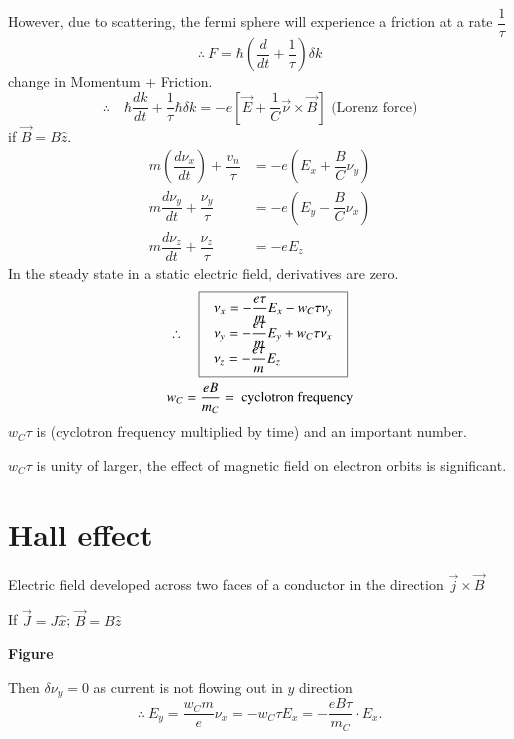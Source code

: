 However, due to scattering, the fermi sphere will experience a friction at a rate $\dfrac{1}{\tau}$
$$
\therefore \ F=\hbar \left(\dfrac{d}{dt}+\dfrac{1}{\tau}\right)\delta k
$$
change in Momentum + Friction.
$$
\therefore\quad \hbar \dfrac{dk}{dt}+\dfrac{1}{\tau}\hbar \delta k=-e\left[\overrightarrow{E}+\dfrac{1}{C}\overrightarrow{\nu}\times \overrightarrow{B}\right] \text{ (Lorenz force)}
$$
if $\overrightarrow{B}=B\widehat{z}$.
\begin{align*}
m\left(\dfrac{d\nu_{x}}{dt}\right)+\dfrac{v_{n}}{\tau} &= -e\left(E_{x}+\dfrac{B}{C}\nu_{y}\right)\\[3pt]
m\dfrac{d\nu_{y}}{dt}+\dfrac{\nu_{y}}{\tau} &= -e\left(E_{y}-\dfrac{B}{C}\nu_{x}\right)\\
m\dfrac{d\nu_{z}}{dt}+\dfrac{\nu_{z}}{\tau} &= -eE_{z}
\end{align*}
In the steady state in a static electric field, derivatives are zero.
\begin{gather*}
\therefore\quad 
\fbox{
$
\begin{array}{l}
\nu_{x}=-\dfrac{e\tau}{m}E_{x}-w_{C}\tau \nu_{y}\\
\nu_{y}=-\dfrac{e\tau}{m}E_{y}+w_{C}\tau \nu_{x}\\
\nu_{z}=-\dfrac{e\tau}{m}E_{z}
\end{array}
$
}\\
w_{C}=\dfrac{eB}{m_{C}}=\text{ cyclotron frequency}
\end{gather*}
$w_{C}\tau$ is (cyclotron frequency multiplied by time) and an important number.

$w_{C}\tau$ is unity of larger, the effect of magnetic field on electron orbits is significant.

\section*{Hall effect}

Electric field developed across two faces of a conductor in the direction $\overrightarrow{j}\times \overrightarrow{B}$

If $\overrightarrow{J}=J\widehat{x}$; $\overrightarrow{B}=B\widehat{z}$
\begin{center}
{\bf Figure}
\end{center}

Then $\delta \nu_{y}=0$ as current is not flowing out in $y$ direction
$$
\therefore \ E_{y}=\dfrac{w_{C}m}{e}\nu_{x}=-w_{C}\tau E_{x}=-\dfrac{eB\tau}{m_{C}}\cdot E_{x}.
$$

